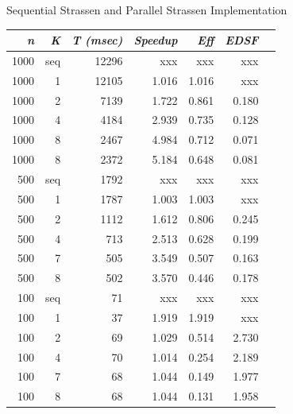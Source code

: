 \documentclass{dependencies/acm_proc_article-sp}
\begin{document}
Sequential Strassen and Parallel Strassen Implementation
\begin{center}
\begin{tabular}{|r|r|r|r|r|r|r|}\hline
{\em n} & {\em K} & {\em T (msec)} & {\em Speedup} & {\em Eff} & {\em EDSF} \\\hline
1000    & seq     &   12296           &   xxx         & xxx       & xxx        \\\hline
1000    & 1       &   12105           &   1.016       & 1.016     & xxx        \\\hline
1000    & 2       &   7139            &   1.722       & 0.861     & 0.180      \\\hline
1000    & 4       &   4184            &   2.939       & 0.735     & 0.128      \\\hline
1000    & 8       &   2467            &   4.984       & 0.712     & 0.071      \\\hline
1000    & 8       &   2372            &   5.184       & 0.648     & 0.081      \\\hline
500     & seq     &   1792            &   xxx         & xxx       & xxx        \\\hline
500     & 1       &   1787            &   1.003       & 1.003     & xxx        \\\hline
500     & 2       &   1112            &   1.612       & 0.806     & 0.245      \\\hline
500     & 4       &   713             &   2.513       & 0.628     & 0.199      \\\hline
500     & 7       &   505             &   3.549       & 0.507     & 0.163      \\\hline
500     & 8       &   502             &   3.570       & 0.446     & 0.178      \\\hline
100     & seq     &   71              &   xxx         & xxx       & xxx        \\\hline
100     & 1       &   37              &   1.919       & 1.919     & xxx        \\\hline
100     & 2       &   69              &   1.029       & 0.514     & 2.730      \\\hline
100     & 4       &   70              &   1.014       & 0.254     & 2.189      \\\hline
100     & 7       &   68              &   1.044       & 0.149     & 1.977      \\\hline
100     & 8       &   68              &   1.044       & 0.131     & 1.958      \\\hline
\end{tabular}
\end{center}
\end{document}
